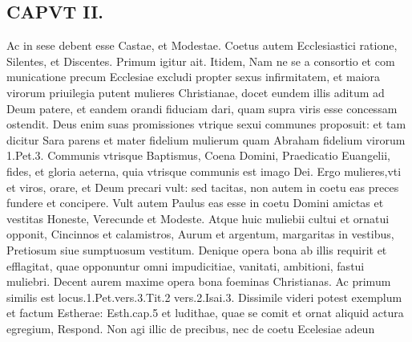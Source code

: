 \documentclass{article}
\begin{document}
\begin{pages}
\section*{CAPVT  II. }
\marginpar{[ p.77 ]}\pstart Ac in sese debent esse Castae, et Modestae. Coetus autem Ecclesiastici ratione, Silentes, et Discentes. Primum igitur ait. Itidem, Nam ne se a consortio et com municatione precum Ecclesiae excludi propter sexus infirmitatem, et maiora virorum priuilegia putent mulieres Christianae, docet eundem illis aditum ad Deum patere, et eandem orandi fiduciam dari, quam supra viris esse concessam ostendit. Deus enim suas promissiones vtrique sexui communes proposuit: et tam dicitur Sara parens et mater fidelium mulierum quam Abraham fidelium virorum 1.Pet.3. Communis vtrisque Baptismus, Coena Domini, Praedicatio Euangelii, fides, et gloria aeterna, quia vtrisque communis est imago Dei. Ergo mulieres,vti et viros, orare, et Deum precari vult: sed tacitas, non autem in coetu eas preces fundere et concipere. Vult autem Paulus eas esse in coetu Domini amictas et vestitas Honeste, Verecunde et Modeste. Atque huic muliebii cultui et ornatui opponit, Cincinnos et calamistros, Aurum et argentum, margaritas in vestibus, Pretiosum siue sumptuosum vestitum. Denique opera bona ab illis requirit et efflagitat, quae opponuntur omni impudicitiae, vanitati, ambitioni, fastui muliebri. Decent aurem maxime opera bona foeminas Christianas. Ac primum similis est locus.1.Pet.vers.3.Tit.2 vers.2.Isai.3. Dissimile videri potest exemplum et factum Estherae: Esth.cap.5 et ludithae, quae se comit et ornat aliquid actura egregium, Respond. Non agi illic de precibus, nec de coetu Ecelesiae adeun\pend

\end{pages}
\end{document}
